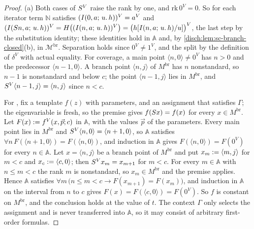 \begin{proof}
(a) Both cases of $S^V$ raise the rank by one, and
$\mathrm{rk}\,0^V=0$. So for each iterator term $\mathbb N$ satisfies
$(I(0,a;\,u.\,h))^V=a^V$ and
$(I(S n,a;\,u.\,h))^V=H\bigl((I(n,a;\,u.\,h))^V\bigr)
=\bigl(h[I(n,a;\,u.\,h)/u]\bigr)^V$, the last step by the
substitution identity; these identities hold in $\mathbb A$ and, by
\cref{disch:lem:sc-branch-closed}(b), in $\mathcal M^{\mathrm{br}}$.
Separation holds since $0^V\neq 1^V$, and the split by the definition of
$\delta^V$ with actual equality. For coverage, a main point
$\langle n,0\rangle\neq 0^V$ has $n>0$ and the predecessor
$\langle n-1,0\rangle$. A branch point $\langle n,j\rangle$ of
$M^{\mathrm{br}}$ has $n$ nonstandard, so $n-1$ is nonstandard and below
$c$; the point $\langle n-1,j\rangle$ lies in $M^{\mathrm{br}}$, and
$S^V\langle n-1,j\rangle=\langle n,j\rangle$ since $n<c$.

For , fix a template $f(z)$ with parameters, and an
assignment that satisfies $\Gamma$; the eigenvariable is fresh, so the
premise gives $f(S x)=f(x)$ for every $x\in M^{\mathrm{br}}$. Let
$F(x)\mathrel{:=} f^V(x,\vec p;c)$ in $\mathbb A$, with the values $\vec p$ of the
parameters. Every main point lies in $M^{\mathrm{br}}$ and
$S^V\langle n,0\rangle=\langle n+1,0\rangle$, so $\mathbb A$ satisfies
$\forall n\,F(\langle n+1,0\rangle)=F(\langle n,0\rangle)$, and induction in
$\mathbb A$ gives $F(\langle n,0\rangle)=F(0^V)$ for every $n\in\mathbb A$.
Let $x=\langle n,j\rangle$ be a branch point of $M^{\mathrm{br}}$ and put
$x_m\mathrel{:=}\langle m,j\rangle$ for $m<c$ and $x_c\mathrel{:=}\langle c,0\rangle$;
then $S^V x_m=x_{m+1}$ for $m<c$. For every $m\in\mathbb A$ with
$n\le m<c$ the rank $m$ is nonstandard, so $x_m\in M^{\mathrm{br}}$ and the
premise applies. Hence $\mathbb A$ satisfies
$\forall m\,\bigl(n\le m<c\to F(x_{m+1})=F(x_m)\bigr)$, and induction in
$\mathbb A$ on the interval from $n$ to $c$ gives
$F(x)=F(\langle c,0\rangle)=F(0^V)$. So $f$ is constant on
$M^{\mathrm{br}}$, and the conclusion holds at the value of $t$. The context
$\Gamma$ only selects the assignment and is never transferred into
$\mathbb A$, so it may consist of arbitrary first-order formulas.


\end{proof}
